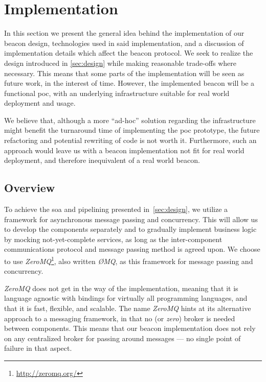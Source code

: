 \section{Implementation}
\label{sec:implementation}

In this section we present the general idea behind the implementation of our beacon design, technologies used in said implementation, and a discussion of implementation details which affect the beacon protocol.
We seek to realize the design introduced in \cref{sec:design} while making reasonable trade-offs where necessary.
This means that some parts of the implementation will be seen as future work, in the interest of time.
However, the implemented beacon will be a functional \gls{poc}, with an underlying infrastructure suitable for real world deployment and usage.

We believe that, although a more \enquote{ad-hoc} solution regarding the infrastructure might benefit the turnaround time of implementing the \gls{poc} prototype, the future refactoring and potential rewriting of code is not worth it.
Furthermore, such an approach would leave us with a beacon implementation not fit for real world deployment, and therefore inequivalent of a real world beacon.

\subsection{Overview}%
\label{sub:overview}
To achieve the \acrfull{soa} and pipelining presented in~\cref{sec:design}, we utilize a framework for asynchronous message passing and concurrency.
This will allow us to develop the components separately and to gradually implement business logic by mocking not-yet-complete services, as long as the inter-component communications protocol and message passing method is agreed upon.
We choose to use \textit{ZeroMQ}\footnote{\url{http://zeromq.org/}}, also written \textit{ØMQ}, as this framework for message passing and concurrency.

\textit{ZeroMQ} does not get in the way of the implementation, meaning that it is language agnostic with bindings for virtually all programming languages, and that it is fast, flexible, and scalable.
The name \textit{ZeroMQ} hints at its alternative approach to a messaging framework, in that no (or \textit{zero}) broker is needed between components.
This means that our beacon implementation does not rely on any centralized broker for passing around messages --- no single point of failure in that aspect.


